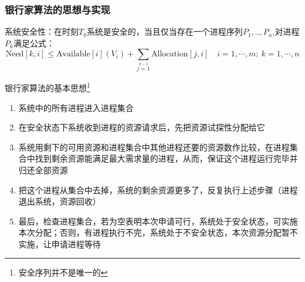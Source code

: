 \documentclass[cs4size,a4paper,10pt]{ctexart}
\begin{document}
	\subsubsection{银行家算法的思想与实现}
	系统安全性：在时刻$T_0$系统是安全的，当且仅当存在一个进程序列$P_1,..,P_n$,对进程$P_k$满足公式：
	$$ \mathrm{Need}[k, i] \leq \mathrm{Available}[i](V_i) + \sum\limits_{j=1}\limits^{k-1}\mathrm{Allocation}[j, i]\quad i = 1,\cdots,m;\ k = 1,\cdots,n$$

	银行家算法的基本思想\footnote{安全序列并不是唯一的}
	\begin{enumerate}[label=\arabic*.]
		\item 系统中的所有进程进入进程集合
		\item 在安全状态下系统收到进程的资源请求后，先把资源试探性分配给它
		\item 系统用剩下的可用资源和进程集合中其他进程还要的资源数作比较，在进程集合中找到剩余资源能满足最大需求量的进程，从而，保证这个进程运行完毕并归还全部资源
		\item 把这个进程从集合中去掉，系统的剩余资源更多了，反复执行上述步骤（进程退出系统，资源回收）
		\item 最后，检查进程集合，若为空表明本次申请可行，系统处于安全状态，可实施本次分配；否则，有进程执行不完，系统处于不安全状态，本次资源分配暂不实施，让申请进程等待	
	\end{enumerate}
\end{document}
